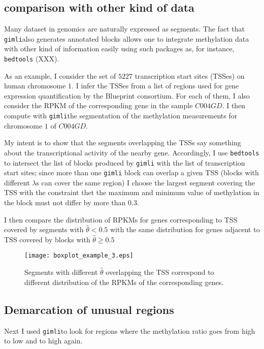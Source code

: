 \documentclass[11pt]{amsart}
\newcommand{\gimli}{\texttt{gimli}}
\begin{document}
\subsection{comparison with other kind of data}

Many dataset in genomics are naturally expressed as segments. The
fact that \gimli also generates annotated blocks allows one to
integrate methylation data with other kind of information easily
using such packages as, for instance, \texttt{bedtools} (XXX).

As an example, I consider the set of $5227$ transcription start sites
(TSSes) on human chromosome $1$. I infer the TSSes from a list of 
regions used for gene expression quantification by the Blueprint 
consortium. For each of them, I also consider the RPKM of the corresponding
gene in the sample $C004GD$. I then compute with \gimli the segmentation
of the methylation measurements for chromosome $1$ of $C004GD$.

My intent is to show that the segments overlapping the TSSs
say something about the transcriptional activity of the nearby gene.
Accordingly,
I use \texttt{bedtools} to intersect the list of blocks produced by \gimli
with the list of transcription start sites; since more than one \gimli
block can overlap a given TSS (blocks with different $\lambda$s can 
cover the same region) I choose the largest segment covering the TSS
with the constraint thet the maximum and minimum value of methylation
in the block must not differ by more than $0.3$.

I then compare the distribution of RPKMs for genes corresponding
to TSS covered by segments with $\hat{\theta}<0.5$ with the same distribution
for genes adjacent to TSS covered by blocks with $\hat{\theta} \geq 0.5$

\begin{figure}\label{ex3}
\texttt{[image: boxplot\_example\_3.eps]}
\caption{Segments with different $\hat{\theta}$ overlapping the TSS correspond
to different distribution of the RPKMs of the corresponding genes.}
\end{figure}

\subsection{Demarcation of unusual regions} 

Next I used \gimli  to look for regions where the 
methylation
ratio goes from high to low and to high again.
\end{document}
